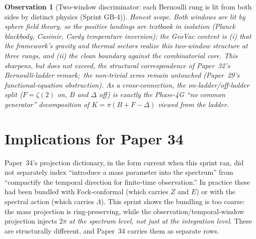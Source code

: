\documentclass[11pt]{article}
\newtheorem{observation}{Observation}
\begin{document}
\begin{observation}[Two-window discriminator: each Bernoulli rung is lit
from both sides by distinct physics (Sprint GB-4)]
\emph{Honest scope.} Both windows are lit by sphere field theory, so
the positive landings are textbook in isolation (Planck blackbody,
Casimir, Cardy temperature inversion); the GeoVac content is (i) that
the framework's gravity and thermal sectors realize this two-window
structure at three rungs, and (ii) the clean boundary against the
combinatorial core. This sharpens, but does not exceed, the structural
correspondence of Paper~32's Bernoulli-ladder remark;\ the
non-trivial zeros remain untouched (Paper~29's functional-equation
obstruction). As a cross-connection, the
on-ladder/off-ladder split ($F=\zeta(2)$ on, $B$ and $\Delta$ off) is
exactly the Phase-4G ``no common generator'' decomposition of
$K = \pi(B+F-\Delta)$ viewed from the ladder.
\end{observation}

\section{Implications for Paper 34}
\label{sec:paper34}

Paper~34's projection dictionary, in the form current when this sprint
ran, did not separately index ``introduce a mass parameter
into the spectrum'' from ``compactify the temporal direction for
finite-time observation.''  In practice these had been bundled with
Fock-conformal (which carries $Z$ and $E$) or with the spectral action
(which carries $\Lambda$).  This sprint shows the bundling is too
coarse: the mass projection is ring-preserving, while the
observation/temporal-window projection injects $2\pi$ \emph{at the
spectrum level, not just at the integration level}.  These are
structurally different, and Paper~34 carries them as separate rows.
\end{document}
